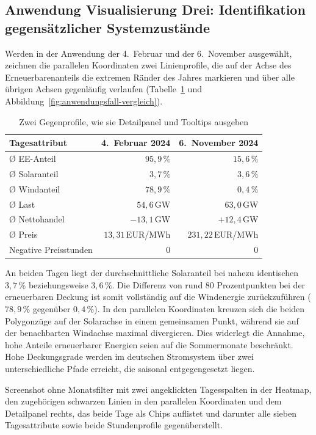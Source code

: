 \subsection{Anwendung Visualisierung Drei: Identifikation gegensätzlicher Systemzustände}\label{sec:anwendung3}

Werden in der Anwendung der 4.\ Februar und der 6.\ November ausgewählt, zeichnen die parallelen Koordinaten zwei Linienprofile, die auf der Achse des Erneuerbarenanteils die extremen Ränder des Jahres markieren und über alle übrigen Achsen gegenläufig verlaufen (Tabelle~\ref{tab:gegensatz} und Abbildung~\ref{fig:anwendungsfall-vergleich}).

\begin{table}[H]
\centering\small
\caption{Zwei Gegenprofile, wie sie Detailpanel und Tooltips ausgeben}\label{tab:gegensatz}
\begin{tabular}{@{}lrr@{}}
\toprule
Tagesattribut & 4.\ Februar 2024 & 6.\ November 2024 \\
\midrule
Ø EE-Anteil & $95{,}9\,\%$ & $15{,}6\,\%$ \\
Ø Solaranteil & $3{,}7\,\%$ & $3{,}6\,\%$ \\
Ø Windanteil & $78{,}9\,\%$ & $0{,}4\,\%$ \\
Ø Last & $54{,}6$\,GW & $63{,}0$\,GW \\
Ø Nettohandel & $-13{,}1$\,GW & $+12{,}4$\,GW \\
Ø Preis & $13{,}31$\,EUR/MWh & $231{,}22$\,EUR/MWh \\
Negative Preisstunden & $0$ & $0$ \\
\bottomrule
\end{tabular}
\end{table}

An beiden Tagen liegt der durchschnittliche Solaranteil bei nahezu identischen $3{,}7\,\%$ beziehungsweise $3{,}6\,\%$. Die Differenz von rund 80 Prozentpunkten bei der erneuerbaren Deckung ist somit vollständig auf die Windenergie zurückzuführen ($78{,}9\,\%$ gegenüber $0{,}4\,\%$). In den parallelen Koordinaten kreuzen sich die beiden Polygonzüge auf der Solarachse in einem gemeinsamen Punkt, während sie auf der benachbarten Windachse maximal divergieren. Dies widerlegt die Annahme, hohe Anteile erneuerbarer Energien seien auf die Sommermonate beschränkt. Hohe Deckungsgrade werden im deutschen Stromsystem über zwei unterschiedliche Pfade erreicht, die saisonal entgegengesetzt liegen.

{Screenshot ohne Monatsfilter mit zwei angeklickten Tagesspalten in der Heatmap, den zugehörigen schwarzen Linien in den parallelen Koordinaten und dem Detailpanel rechts, das beide Tage als Chips auflistet und darunter alle sieben Tagesattribute sowie beide Stundenprofile gegenüberstellt.}

